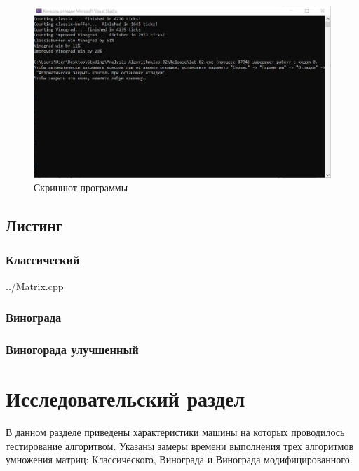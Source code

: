 \documentclass[a4paper, 14pt]{article}
\begin{document}
	\begin{figure}
		\centering
		\includegraphics[width=0.7\linewidth]{screenshots/interface}
		\caption{Скриншот программы}
		\label{fig:interface}
	\end{figure}
	
	\subsection{Листинг}
	
	\subsubsection{Классический}
		
	 {../Matrix.cpp}
	
	\subsubsection{Винограда}
	
	
	
	\subsubsection{Виногорада улучшенный}
	
	
		
	\newpage
	\section{Исследовательский раздел}
	
	В данном разделе приведены характеристики машины на которых проводилось тестирование алгоритвом. Указаны замеры времени выполнения трех алгоритмов умножения матриц: Классического, Винограда и Винограда модифицированного.
	
\end{document}
